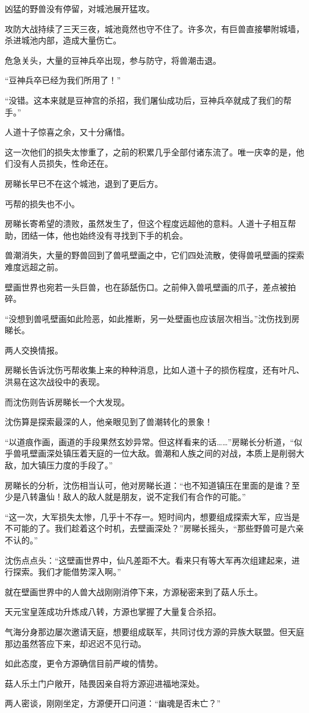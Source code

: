 \begin{this_body}
凶猛的野兽没有停留，对城池展开猛攻。

攻防大战持续了三天三夜，城池竟然也守不住了。许多次，有巨兽直接攀附城墙，杀进城池内部，造成大量伤亡。

危急关头，大量的豆神兵卒出现，参与防守，将兽潮击退。

“豆神兵卒已经为我们所用了！”

“没错。这本来就是豆神宫的杀招，我们屠仙成功后，豆神兵卒就成了我们的帮手。”

人道十子惊喜之余，又十分痛惜。

这一次他们的损失太惨重了，之前的积累几乎全部付诸东流了。唯一庆幸的是，他们没有人员损失，性命还在。

房睇长早已不在这个城池，退到了更后方。

丐帮的损失也不小。

房睇长寄希望的溃败，虽然发生了，但这个程度远超他的意料。人道十子相互帮助，团结一体，他也始终没有寻找到下手的机会。

兽潮消失，大量的野兽回到了兽吼壁画之中，它们四处流散，使得兽吼壁画的探索难度远超之前。

壁画世界也宛若一头巨兽，也在舔舐伤口。之前伸入兽吼壁画的爪子，差点被拍碎。

“没想到兽吼壁画如此险恶，如此推断，另一处壁画也应该层次相当。”沈伤找到房睇长。

两人交换情报。

房睇长告诉沈伤丐帮收集上来的种种消息，比如人道十子的损伤程度，还有叶凡、洪易在这次战役中的表现。

而沈伤则告诉房睇长一个大发现。

沈伤算是探索最深的人，他亲眼见到了兽潮转化的景象！

“以道痕作画，画道的手段果然玄妙异常。但这样看来的话……”房睇长分析道，“似乎兽吼壁画深处镇压着天庭的一位大敌。兽潮和人族之间的对战，本质上是削弱大敌，加大镇压力度的手段了。”

房睇长的分析，沈伤相当认可，他对房睇长道：“也不知道镇压在里面的是谁？至少是八转蛊仙！敌人的敌人就是朋友，说不定我们有合作的可能。”

“这一次，大军损失太惨，几乎十不存一。短时间内，想要组成探索大军，应当是不可能的了。我们趁着这个时机，去壁画深处？”房睇长摇头，“那些野兽可是六亲不认的。”

沈伤点点头：“这壁画世界中，仙凡差距不大。看来只有等大军再次组建起来，进行探索。我们才能借势深入啊。”

就在壁画世界中的人兽大战刚刚消停下来，方源秘密来到了菇人乐土。

天元宝皇莲成功升炼成八转，方源也掌握了大量复合杀招。

气海分身那边屡次邀请天庭，想要组成联军，共同讨伐方源的异族大联盟。但天庭那边虽然答应下来，却迟迟不见行动。

如此态度，更令方源确信目前严峻的情势。

菇人乐土门户敞开，陆畏因亲自将方源迎进福地深处。

两人密谈，刚刚坐定，方源便开口问道：“幽魂是否未亡？”

\end{this_body}

